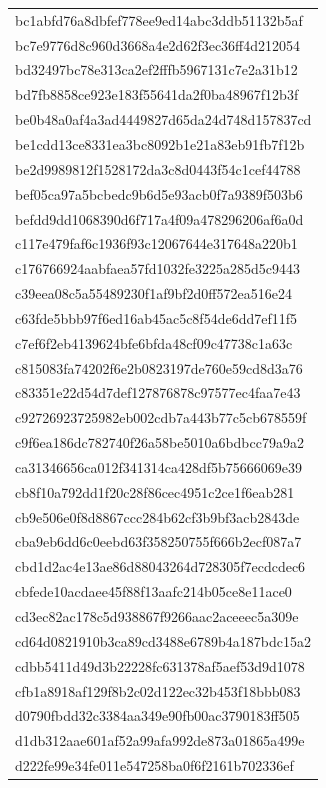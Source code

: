 \begin{tabular}{l}
bc1abfd76a8dbfef778ee9ed14abc3ddb51132b5af \\
bc7e9776d8c960d3668a4e2d62f3ec36ff4d212054 \\
bd32497bc78e313ca2ef2fffb5967131c7e2a31b12 \\
bd7fb8858ce923e183f55641da2f0ba48967f12b3f \\
be0b48a0af4a3ad4449827d65da24d748d157837cd \\
be1cdd13ce8331ea3bc8092b1e21a83eb91fb7f12b \\
be2d9989812f1528172da3c8d0443f54c1cef44788 \\
bef05ca97a5bcbedc9b6d5e93acb0f7a9389f503b6 \\
befdd9dd1068390d6f717a4f09a478296206af6a0d \\
c117e479faf6c1936f93c12067644e317648a220b1 \\
c176766924aabfaea57fd1032fe3225a285d5c9443 \\
c39eea08c5a55489230f1af9bf2d0ff572ea516e24 \\
c63fde5bbb97f6ed16ab45ac5c8f54de6dd7ef11f5 \\
c7ef6f2eb4139624bfe6bfda48cf09c47738c1a63c \\
c815083fa74202f6e2b0823197de760e59cd8d3a76 \\
c83351e22d54d7def127876878c97577ec4faa7e43 \\
c92726923725982eb002cdb7a443b77c5cb678559f \\
c9f6ea186dc782740f26a58be5010a6bdbcc79a9a2 \\
ca31346656ca012f341314ca428df5b75666069e39 \\
cb8f10a792dd1f20c28f86cec4951c2ce1f6eab281 \\
cb9e506e0f8d8867ccc284b62cf3b9bf3acb2843de \\
cba9eb6dd6c0eebd63f358250755f666b2ecf087a7 \\
cbd1d2ac4e13ae86d88043264d728305f7ecdcdec6 \\
cbfede10acdaee45f88f13aafc214b05ce8e11ace0 \\
cd3ec82ac178c5d938867f9266aac2aceeec5a309e \\
cd64d0821910b3ca89cd3488e6789b4a187bdc15a2 \\
cdbb5411d49d3b22228fc631378af5aef53d9d1078 \\
cfb1a8918af129f8b2c02d122ec32b453f18bbb083 \\
d0790fbdd32c3384aa349e90fb00ac3790183ff505 \\
d1db312aae601af52a99afa992de873a01865a499e \\
d222fe99e34fe011e547258ba0f6f2161b702336ef \\

\end{tabular}
